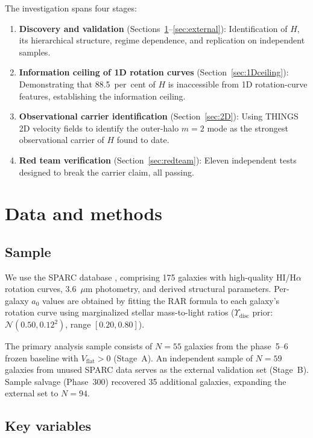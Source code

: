\documentclass[fleqn,usenatbib]{mnras}
\newcommand{\vflat}{V_\mathrm{flat}}
\newcommand{\azero}{a_0}
\newcommand{\mtwo}{m{=}2}
\begin{document}
The investigation spans four stages:
\begin{enumerate}
\item \textbf{Discovery and validation} (Sections~\ref{sec:data}--\ref{sec:external}): Identification of $H$, its hierarchical structure, regime dependence, and replication on independent samples.
\item \textbf{Information ceiling of 1D rotation curves} (Section~\ref{sec:1Dceiling}): Demonstrating that 88.5~per~cent of $H$ is inaccessible from 1D rotation-curve features, establishing the information ceiling.
\item \textbf{Observational carrier identification} (Section~\ref{sec:2D}): Using THINGS 2D velocity fields to identify the outer-halo $\mtwo$ mode as the strongest observational carrier of $H$ found to date.
\item \textbf{Red team verification} (Section~\ref{sec:redteam}): Eleven independent tests designed to break the carrier claim, all passing.
\end{enumerate}


\section{Data and methods}
\label{sec:data}

\subsection{Sample}

We use the SPARC database \citep{Lelli2016}, comprising 175 galaxies with high-quality HI/H$\alpha$ rotation curves, 3.6~$\mu$m photometry, and derived structural parameters.
Per-galaxy $\azero$ values are obtained by fitting the \citet{McGaugh2016} RAR formula to each galaxy's rotation curve using marginalized stellar mass-to-light ratios ($\Upsilon_\mathrm{disc}$ prior: $\mathcal{N}(0.50, 0.12^2)$, range $[0.20, 0.80]$).

The primary analysis sample consists of $N = 55$ galaxies from the phase~5--6 frozen baseline with $\vflat > 0$ (Stage~A).
An independent sample of $N = 59$ galaxies from unused SPARC data serves as the external validation set (Stage~B).
Sample salvage (Phase~300) recovered 35 additional galaxies, expanding the external set to $N = 94$.

\subsection{Key variables}
\end{document}
